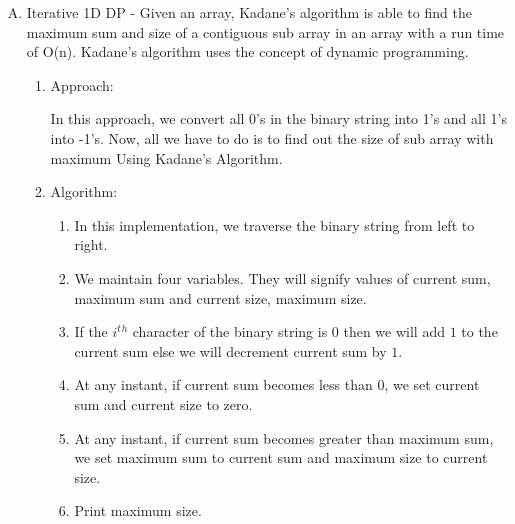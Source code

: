 \documentclass[conference]{IEEEtran}
\begin{document}
{\begin{enumerate}[A)]
\begin{enumerate}
    In this approach, we will convert given binary string into integer array such that if \textit{$string[i]=‘0’$} then \textit{$arr\textsubscript{i}=-1$} and if \textit{$string[i]=‘1’$} then \textit{$arr\textsubscript{i}=1$}. Now, for each index we need to make decision whether to take it or skip it. So, we declare a 2D array to memorize result for that index.
    \item Algorithm:
    \begin{enumerate}
    \item The idea is to recursively find size of sub array corresponding to indices until base case (i.e. end of the binary string is reached).
\item Create a function that checks if the given binary string consists of all 1's. If it consists of all 1's, the answer will be 0.
\item Create a recursive function to calculate maximum difference of number of 0's and number of 1's corresponding to each index in the given binary string.
\item The base case of recursion is when end of the given binary string is reached.
\item Print the answer.\\
\end{enumerate}
    \end{enumerate}
    
    \item Iterative 1D DP - 
    Given an array, Kadane’s algorithm is able to find the maximum sum and size of a contiguous sub array in an array with a run time of O(n). Kadane's algorithm uses the concept of dynamic programming.
    \begin{enumerate}
    \item Approach:
    
     In this approach, we convert all 0's in the binary string into 1's and all 1's into -1's. Now, all we have to do is to find out the size of sub array with maximum Using Kadane’s Algorithm.
    \item Algorithm:
    \begin{enumerate}
    \item In this implementation, we traverse the binary string from left to right.
    \item We maintain four variables. They will signify  values of current sum, maximum sum  and current size, maximum size.
    \item If the \textit{$i^t$}\textit{$^h$} character of the binary string is \textit{$0$} then we will add \textit{$1$} to the current sum else we will decrement current sum by \textit{$1$}.
    \item At any instant, if current sum becomes less than 0, we set current sum and current size to zero.
    \item At any instant, if current sum becomes greater than maximum sum, we set maximum sum to current sum and maximum size to current size.
    \item Print maximum size.\\
\end{enumerate}
    \end{enumerate}
    

\end{enumerate}}
\end{document}
